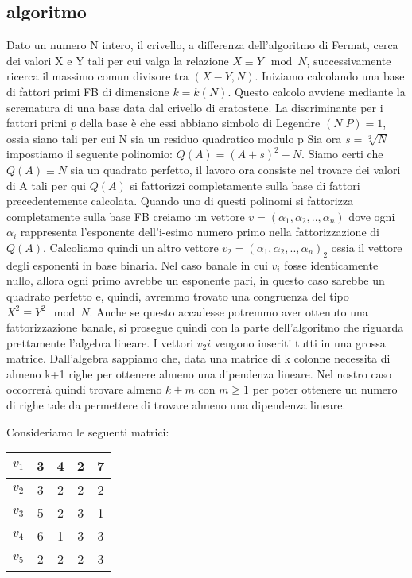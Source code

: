 \begin{flushleft}
\subsection*{algoritmo}
Dato un numero N intero, il crivello, a differenza dell'algoritmo di Fermat, cerca dei valori 
X e Y tali per cui valga la relazione $X \equiv Y \mod N$, successivamente ricerca il massimo comun
divisore tra $(X-Y,N)$.
Iniziamo calcolando una base di fattori primi FB di dimensione $k=k(N)$.
Questo calcolo avviene mediante la scrematura di una base data dal crivello di eratostene.
La discriminante per i fattori primi \emph{p} della base è che essi abbiano simbolo di Legendre 
$(N|P)=1$, ossia siano tali per cui N sia un residuo quadratico modulo p
Sia ora $s=\sqrt[2]{N}$ impostiamo il seguente polinomio: $Q(A)=(A+s)^2-N$.
Siamo certi che $Q(A)\equiv N$ sia un quadrato perfetto, il lavoro ora consiste nel 
trovare dei valori di A tali per qui $Q(A)$ si fattorizzi completamente sulla base di fattori
precedentemente calcolata.
Quando uno di questi polinomi si fattorizza completamente sulla base FB creiamo un vettore
$v=(\alpha_1,\alpha_2, .. , \alpha_n)$ dove ogni $\alpha_i$ rappresenta l'esponente dell'i-esimo numero primo nella fattorizzazione di $Q(A)$.
Calcoliamo quindi un altro vettore $v_2=(\alpha_1,\alpha_2, .. , \alpha_n)_2$ ossia il vettore 
degli esponenti in base binaria.
Nel caso banale in cui $v_i$ fosse identicamente nullo, allora ogni primo avrebbe un esponente
pari, in questo caso sarebbe un quadrato perfetto e, quindi, avremmo trovato una congruenza del tipo $X^2 \equiv Y^2\mod N$.
Anche se questo accadesse potremmo aver ottenuto una fattorizzazione banale, si prosegue quindi
con la parte dell'algoritmo che riguarda prettamente l'algebra lineare.
I vettori $v_2i$ vengono inseriti tutti in una grossa matrice.
Dall'algebra sappiamo che, data una matrice di k colonne necessita di almeno k+1 righe per 
ottenere almeno una dipendenza lineare.
Nel nostro caso occorrerà quindi trovare almeno $k+m$ con $m\geq1$ per poter ottenere un numero di righe tale da permettere di trovare almeno una dipendenza lineare.

Consideriamo le seguenti matrici:

\begin{center}

\begin{tabular}{ |l|c|c|c|c| }
\hline
$v_1$ & 3 & 4 & 2 & 7\\
\hline
$v_2$ & 3 & 2 & 2 & 2\\
\hline
$v_3$ & 5 & 2 & 3 & 1\\
\hline
$v_4$ & 6 & 1 & 3 & 3\\
\hline
$v_5$ & 2 & 2 & 2 & 3\\
\hline
\end{tabular}


\end{center}
\end{flushleft}
